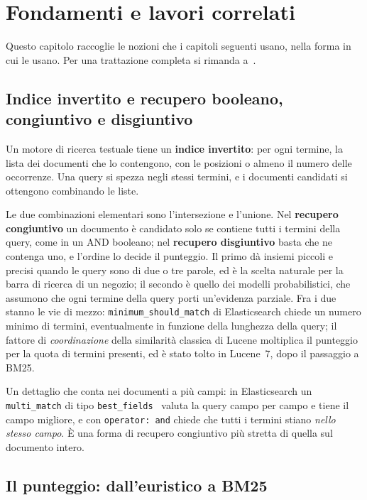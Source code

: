 \chapter{Fondamenti e lavori correlati}\label{chapter:fondamenti}

Questo capitolo raccoglie le nozioni che i capitoli seguenti usano, nella forma in
cui le usano. Per una trattazione completa si rimanda a~\cite{manning2008ir}.

\section{Indice invertito e recupero booleano, congiuntivo e disgiuntivo}\label{sec:indice}

Un motore di ricerca testuale tiene un \textbf{indice invertito}: per ogni
termine, la lista dei documenti che lo contengono, con le posizioni o almeno il
numero delle occorrenze. Una query si spezza negli stessi termini, e i documenti
candidati si ottengono combinando le liste.

Le due combinazioni elementari sono l'intersezione e l'unione. Nel
\textbf{recupero congiuntivo} un documento è candidato solo se contiene tutti i
termini della query, come in un AND booleano; nel \textbf{recupero disgiuntivo}
basta che ne contenga uno, e l'ordine lo decide il punteggio. Il primo dà insiemi
piccoli e precisi quando le query sono di due o tre parole, ed è la scelta
naturale per la barra di ricerca di un negozio; il secondo è quello dei modelli
probabilistici, che assumono che ogni termine della query porti un'evidenza
parziale. Fra i due stanno le vie di mezzo: \texttt{minimum\_should\_match} di
Elasticsearch chiede un numero minimo di termini, eventualmente in funzione della
lunghezza della query; il fattore di \emph{coordinazione} della similarità
classica di Lucene moltiplica il punteggio per la quota di termini presenti, ed è
stato tolto in Lucene~7, dopo il passaggio a BM25.

Un dettaglio che conta nei documenti a più campi: in Elasticsearch un
\texttt{multi\_match} di tipo \texttt{best\_fields}~\cite{es-multimatch} valuta la
query campo per campo e tiene il campo migliore, e con \texttt{operator: and}
chiede che tutti i termini stiano \emph{nello stesso campo}. È una forma di
recupero congiuntivo più stretta di quella sul documento intero.

\section{Il punteggio: dall'euristico a BM25}\label{sec:bm25}

